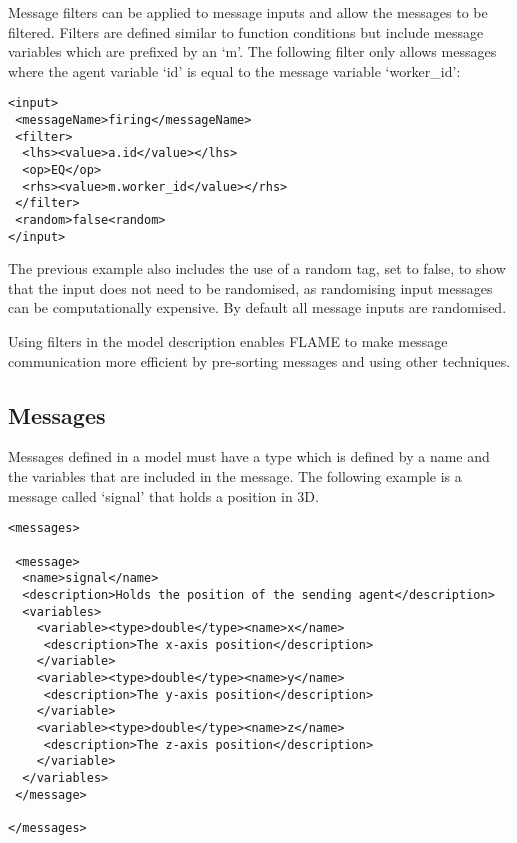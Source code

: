 Message filters can be applied to message inputs and allow the messages to be
filtered. Filters are defined similar to function conditions but include
message variables which are prefixed by an `m'. The following filter only
allows messages where the agent variable `id' is equal to the message variable
`worker\_id':

\begin{mylisting}
\begin{verbatim}
<input>
 <messageName>firing</messageName>
 <filter>
  <lhs><value>a.id</value></lhs>
  <op>EQ</op>
  <rhs><value>m.worker_id</value></rhs>
 </filter>
 <random>false<random>
</input>
\end{verbatim}
\end{mylisting}

The previous example also includes the use of a random tag, set to false, to show
that the input does not need to be randomised, as randomising input messages can be
computationally expensive. By default all message inputs are randomised.

Using filters in the model description enables FLAME to make message
communication more efficient by pre-sorting messages and using other techniques.


\subsection{Messages}

Messages defined in a model must have a type which is defined by a name and the
variables that are included in the message. The following example is a message
called `signal' that holds a position in 3D.

\begin{mylisting}
\begin{verbatim}
<messages>

 <message>
  <name>signal</name>
  <description>Holds the position of the sending agent</description>
  <variables>
    <variable><type>double</type><name>x</name>
     <description>The x-axis position</description>
    </variable>
    <variable><type>double</type><name>y</name>
     <description>The y-axis position</description>
    </variable>
    <variable><type>double</type><name>z</name>
     <description>The z-axis position</description>
    </variable>
  </variables>
 </message>

</messages>
\end{verbatim}
\end{mylisting}
